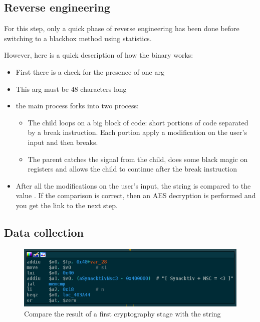 \documentclass[a4paper]{article}
\begin{document}
\subsection{Reverse engineering}

For this step, only a quick phase of reverse engineering has been done before switching to a blackbox method using statistics.\newline

However, here is a quick description of how the binary works: 
\begin{itemize}
\item First there is a check for the presence of one arg
\item This arg must be 48 characters long
\item the main process forks into two process: \begin{itemize}
\item The child loops on a big block of code: short portions of code separated by a break instruction. Each portion apply a modification on the user's input and then breaks.
\item The parent catches the signal from the child, does some black magic on registers and allows the child to continue after the break instruction
\end{itemize}
\item After all the modifications on the user's input, the string is compared to the value \code{[ Synacktiv + NSC = <3]}. If the comparison is correct, then an AES decryption is performed and you get the link to the next step.


\end{itemize}


\subsection{Data collection}

\begin{figure}[H]
    \center
    \includegraphics[scale=0.6]{step1_memcmp}
    \caption{Compare the result of a first cryptography stage with the string }
\end{figure}
\end{document}
